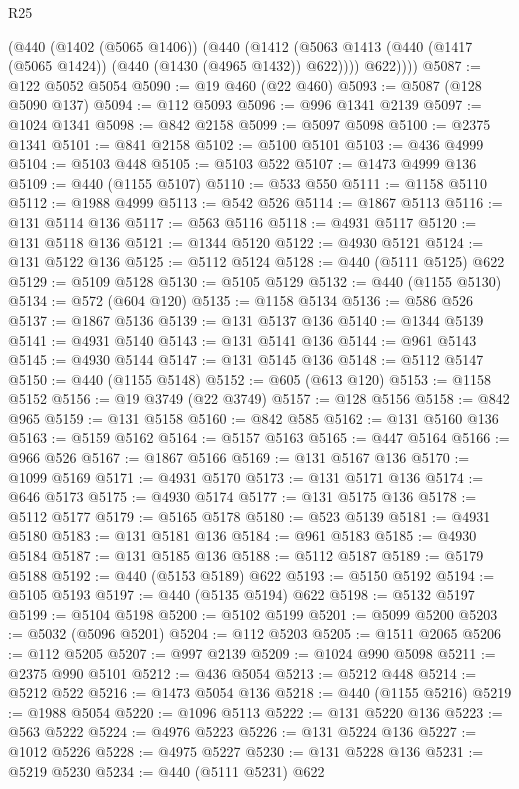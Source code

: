 \begin{lexlean}{R25}
\begin{coremodule}
        (@440
          (@1402 (@5065 @1406))
          (@440
            (@1412 (@5063 @1413 (@440 (@1417 (@5065 @1424)) (@440 (@1430 (@4965 @1432)) @622))))
            @622))))
@5087 := @122 @5052 @5054
@5090 := @19 @460 (@22 @460)
@5093 := @5087 (@128 @5090 @137)
@5094 := @112 @5093
@5096 := @996 @1341 @2139
@5097 := @1024 @1341
@5098 := @842 @2158
@5099 := @5097 @5098
@5100 := @2375 @1341
@5101 := @841 @2158
@5102 := @5100 @5101
@5103 := @436 @4999
@5104 := @5103 @448
@5105 := @5103 @522
@5107 := @1473 @4999 @136
@5109 := @440 (@1155 @5107)
@5110 := @533 @550
@5111 := @1158 @5110
@5112 := @1988 @4999
@5113 := @542 @526
@5114 := @1867 @5113
@5116 := @131 @5114 @136
@5117 := @563 @5116
@5118 := @4931 @5117
@5120 := @131 @5118 @136
@5121 := @1344 @5120
@5122 := @4930 @5121
@5124 := @131 @5122 @136
@5125 := @5112 @5124
@5128 := @440 (@5111 @5125) @622
@5129 := @5109 @5128
@5130 := @5105 @5129
@5132 := @440 (@1155 @5130)
@5134 := @572 (@604 @120)
@5135 := @1158 @5134
@5136 := @586 @526
@5137 := @1867 @5136
@5139 := @131 @5137 @136
@5140 := @1344 @5139
@5141 := @4931 @5140
@5143 := @131 @5141 @136
@5144 := @961 @5143
@5145 := @4930 @5144
@5147 := @131 @5145 @136
@5148 := @5112 @5147
@5150 := @440 (@1155 @5148)
@5152 := @605 (@613 @120)
@5153 := @1158 @5152
@5156 := @19 @3749 (@22 @3749)
@5157 := @128 @5156
@5158 := @842 @965
@5159 := @131 @5158
@5160 := @842 @585
@5162 := @131 @5160 @136
@5163 := @5159 @5162
@5164 := @5157 @5163
@5165 := @447 @5164
@5166 := @966 @526
@5167 := @1867 @5166
@5169 := @131 @5167 @136
@5170 := @1099 @5169
@5171 := @4931 @5170
@5173 := @131 @5171 @136
@5174 := @646 @5173
@5175 := @4930 @5174
@5177 := @131 @5175 @136
@5178 := @5112 @5177
@5179 := @5165 @5178
@5180 := @523 @5139
@5181 := @4931 @5180
@5183 := @131 @5181 @136
@5184 := @961 @5183
@5185 := @4930 @5184
@5187 := @131 @5185 @136
@5188 := @5112 @5187
@5189 := @5179 @5188
@5192 := @440 (@5153 @5189) @622
@5193 := @5150 @5192
@5194 := @5105 @5193
@5197 := @440 (@5135 @5194) @622
@5198 := @5132 @5197
@5199 := @5104 @5198
@5200 := @5102 @5199
@5201 := @5099 @5200
@5203 := @5032 (@5096 @5201)
@5204 := @112 @5203
@5205 := @1511 @2065
@5206 := @112 @5205
@5207 := @997 @2139
@5209 := @1024 @990 @5098
@5211 := @2375 @990 @5101
@5212 := @436 @5054
@5213 := @5212 @448
@5214 := @5212 @522
@5216 := @1473 @5054 @136
@5218 := @440 (@1155 @5216)
@5219 := @1988 @5054
@5220 := @1096 @5113
@5222 := @131 @5220 @136
@5223 := @563 @5222
@5224 := @4976 @5223
@5226 := @131 @5224 @136
@5227 := @1012 @5226
@5228 := @4975 @5227
@5230 := @131 @5228 @136
@5231 := @5219 @5230
@5234 := @440 (@5111 @5231) @622

\end{coremodule}
\end{lexlean}
